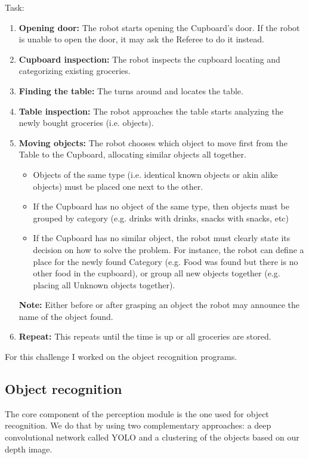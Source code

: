 \documentclass[a4paper, twocolumn]{article}
\begin{document}
    Task:
    \begin{enumerate}
        \item \textbf{Opening door:} The robot starts opening the Cupboard's door. If the robot is unable to open the door, it may ask the Referee to do it instead.
    	\item \textbf{Cupboard inspection:} The robot inspects the cupboard locating and categorizing existing groceries.
    	\item \textbf{Finding the table:} The turns around and locates the table.
    	\item \textbf{Table inspection:} The robot approaches the table starts analyzing the newly bought groceries (i.e. objects).
    	\item \textbf{Moving objects:} The robot chooses which object to move first from the Table to the Cupboard, allocating similar objects all together.
    	\begin{itemize}
    		\item Objects of the same type (i.e. identical known objects or akin alike objects) must be placed one next to the other.
    		\item If the Cupboard has no object of the same type, then objects must be grouped by category (e.g. drinks with drinks, snacks with snacks, etc)
    		\item If the Cupboard has no similar object, the robot must clearly state its decision on how to solve the problem. For instance, the robot can define a place for the newly found Category (e.g. Food was found but there is no other food in the cupboard), or group all new objects together (e.g. placing all Unknown objects together).
    	\end{itemize}

    	\textbf{Note:} Either before or after grasping an object the robot may announce the name of the object found.
    	\item \textbf{Repeat:} This repeats until the time is up or all groceries are stored.
    \end{enumerate}

    For this challenge I worked on the object recognition programs.

    \subsection{Object recognition}

    The core component of the perception module is the one used for object recognition. We do that by using two complementary approaches: a deep convolutional network called YOLO\cite{redmon2016yolo9000} and a clustering of the objects based on our depth image.
\end{document}
